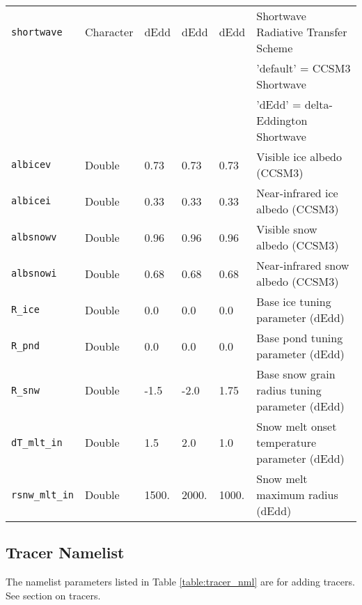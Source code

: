 \begin{table}[hb]
\begin{center}
\begin{tabular}{p{3cm}p{2cm}p{3cm}p{3cm}p{3cm}p{6.5cm}}
{\tt shortwave} & Character & dEdd & dEdd & dEdd & Shortwave Radiative Transfer Scheme \\
                &           &      &      &      & 'default' = CCSM3 Shortwave \\
                &           &      &      &      & 'dEdd' = delta-Eddington Shortwave \\

{\tt albicev} &  Double & 0.73 & 0.73 & 0.73 & Visible ice albedo (CCSM3)\\

{\tt albicei} &  Double & 0.33 & 0.33 & 0.33 & Near-infrared ice albedo (CCSM3)\\

{\tt albsnowv} & Double & 0.96 & 0.96 & 0.96 & Visible snow albedo (CCSM3)\\

{\tt albsnowi} & Double & 0.68 & 0.68 & 0.68 & Near-infrared snow albedo (CCSM3)\\

{\tt R\_ice} & Double & 0.0 & 0.0 & 0.0 & Base ice tuning parameter (dEdd)\\

{\tt R\_pnd} & Double & 0.0 & 0.0 & 0.0 & Base pond tuning parameter (dEdd)\\

{\tt R\_snw} & Double & -1.5 & -2.0 & 1.75 & Base snow grain radius tuning parameter (dEdd)\\

{\tt dT\_mlt\_in} & Double & 1.5 & 2.0 & 1.0 & Snow melt onset temperature parameter (dEdd)\\

{\tt rsnw\_mlt\_in} & Double & 1500. & 2000. & 1000. & Snow melt maximum radius (dEdd)\\

  \hline
  \end{tabular}
  \end{center}
\end{table}
\subsection{Tracer Namelist}

The namelist parameters listed in Table \ref{table:tracer_nml} are for
adding tracers. See section on tracers.

